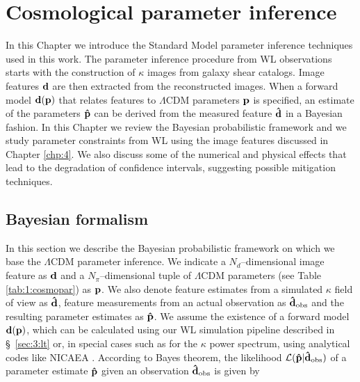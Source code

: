 
\chapter{Cosmological parameter inference}
\lhead[\fancyplain{}{\thepage}]{\fancyplain{}{\rightmark}}
 \thispagestyle{plain}
\setlength{\parindent}{10mm}
\label{chp:5}


In this Chapter we introduce the Standard Model parameter inference techniques used in this work. The parameter inference procedure from WL observations starts with the construction of $\kappa$ images from galaxy shear catalogs. Image features $\mathbf{d}$ are then extracted from the reconstructed images. When a forward model $\mathbf{d}(\mathbf{p})$ that relates features to $\Lambda$CDM parameters $\mathbf{p}$ is specified, an estimate of the parameters $\mathbf{\hat{p}}$ can be derived from the measured feature $\mathbf{\hat{d}}$ in a Bayesian fashion. In this Chapter we review the Bayesian probabilistic framework and we study parameter constraints from WL using the image features discussed in Chapter \ref{chp:4}. We also discuss some of the numerical and physical effects that lead to the degradation of confidence intervals, suggesting possible mitigation techniques.    

\section{Bayesian formalism}
\label{sec:5:bayes}
In this section we describe the Bayesian probabilistic framework on which we base the $\Lambda$CDM parameter inference. We indicate a $N_d$--dimensional image feature as $\mathbf{d}$ and a $N_\pi$--dimensional tuple of $\Lambda$CDM parameters (see Table \ref{tab:1:cosmopar}) as $\mathbf{p}$. We also denote feature estimates from a simulated $\kappa$ field of view as $\mathbf{\hat{d}}$, feature measurements from an actual observation as $\mathbf{\hat{d}}_{\rm obs}$ and the resulting parameter estimates as $\mathbf{\hat{p}}$. We assume the existence of a forward model $\mathbf{d}(\mathbf{p})$, which can be calculated using our WL simulation pipeline described in \S~\ref{sec:3:lt} or, in special cases such as for the $\kappa$ power spectrum, using analytical codes like NICAEA \citep{Nicaea,Nicaea17}. According to Bayes theorem, the likelihood $\mathcal{L}(\mathbf{\hat{p}}\vert\mathbf{\hat{d}}_{\rm obs})$ of a parameter estimate $\mathbf{\hat{p}}$ given an observation $\mathbf{\hat{d}}_{\rm obs}$ is given by

